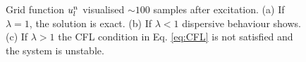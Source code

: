 \begin{figure}[t]
    \caption{Grid function $u_l^n$ visualised $\sim\!100$ samples after excitation. (a) If $\lambda = 1$, the solution is exact. (b) If $\lambda < 1$ dispersive behaviour shows. (c) If $\lambda > 1$ the CFL condition in Eq. \eqref{eq:CFL} is not satisfied and the system is unstable.\label{fig:1DWaveDispersion}}
\end{figure}

